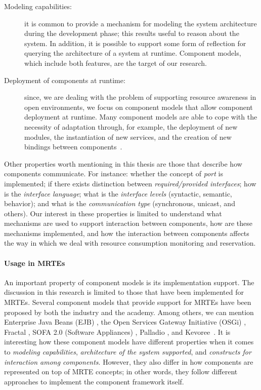 \begin{description}
\item[Modeling capabilities:] it is common to provide a mechanism for modeling the system architecture during the development phase; this results useful to reason about the system.
In addition, it is possible to support some form of reflection for querying the architecture of a system at runtime.
Component models, which include both features, are the target of our research.

\item[Deployment of components at runtime:] since, we are dealing with the problem of supporting resource awareness in open environments, we focus on component models that allow component deployment at runtime.
Many component models are able to cope with the necessity of adaptation through, for example, the deployment of new modules, the instantiation of new services, and the creation of new bindings between components~\cite{Porter:2014:RMC:2602458.2602471, Zheng:2014:RCC:2679601.2680405, Irmert:2008:RAS:1370018.1370036, Ghezzi:2010:QDD:2163764.2163774}.
\end{description}

Other properties worth mentioning in this thesis are those that describe how components communicate.
For instance:  whether the concept of \textit{port} is implemented; if there exists distinction between \textit{required/provided interfaces}; how is the \textit{interface language}; what is the \textit{interface levels} (syntactic, semantic, behavior); and what is the \textit{communication type} (synchronous, unicast, and others).
Our interest in these properties is limited to understand what mechanisms are used to support interaction between components, how are these mechanisms implemented, and how the interaction between components affects the way in which we deal with resource consumption monitoring and reservation.

\paragraph{Usage in MRTEs}
An important property of component models is its implementation support.
The discussion in this research is limited to those that have been implemented for MRTEs.
Several component models that provide support for MRTEs have been proposed by both the industry and the academy.
Among others, we can mention Enterprise Java Beans (EJB) \cite{OracleEJB3.0}, the Open Services Gateway Initiative (OSGi) \cite{OSGI:r5}, 
Fractal \cite{Bruneton:2006:FCM:1152333.1152345}, 
SOFA 2.0 (Software Appliances) \cite{Bures2006}, Palladio \cite{}, and Kevoree~\cite{morin09a,leger2010reliable}.
It is interesting how these component models have different properties when it comes to \textit{modeling capabilities}, \textit{architecture of the system supported}, and \textit{constructs for interaction among components}.
However, they also differ in how components are represented on top of MRTE concepts; in other words, they follow different approaches to implement the component framework itself.

